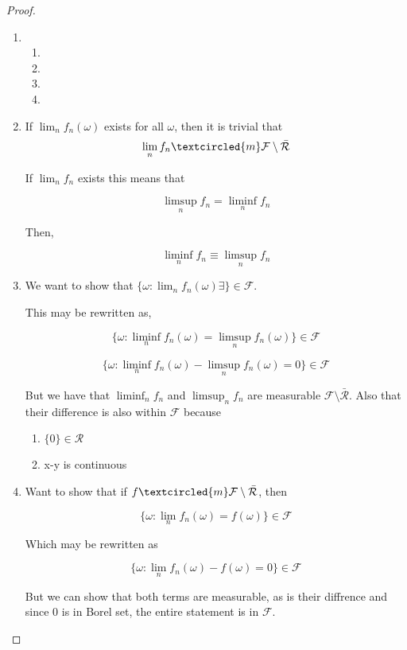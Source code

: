 \documentclass[11pt,fleqn]{book} %
\begin{document}
\begin{proof}

\begin{enumerate}
	\item \begin{enumerate}
		\item 
		\item 
		\item
		\item
	\end{enumerate}
	
	\item If $\lim_n f_n (\omega)$ exists for all $\omega$, then it is trivial that
			$$\lim_n f_n \textcircled{m} \mathcal{F}\setminus \bar{\mathcal{R}} $$

		If $\lim_n f_n$ exists this means that 	

				$$\limsup_n f_n = \liminf_n f_n $$

		Then, 

				$$ \liminf_n f_n \equiv	\limsup_n f_n $$

	\item We want to show that $\{\omega: \lim_n f_n(\omega) \exists \} \in \mathcal{F}$. 

			This may be rewritten as, 

				$$\{\omega: \liminf_n f_n(\omega) = \limsup_n f_n(\omega) \} \in \mathcal{F}$$

				$$\{\omega: \liminf_n f_n(\omega) - \limsup_n f_n(\omega) = 0 \} \in \mathcal{F}$$

		But we have that $\liminf_n f_n$ and $\limsup_n f_n$ are measurable $\mathcal{F}\setminus \bar{\mathcal{R}}$. Also that their difference is also within $\mathcal{F}$ because 

				\begin{enumerate}
					\item $\{0\} \in \mathcal{R}$
					\item x-y is continuous
				\end{enumerate}

	\item Want to show that if $f \textcircled{m} \mathcal{F}\setminus \bar{\mathcal{R}}$, then

			$$  \{\omega: \lim_n f_n(\omega) = f(\omega) \} \in \mathcal{F}$$

	Which may be rewritten as 

			$$ \{\omega: \lim_n f_n(\omega) - f(\omega) = 0 \} \in \mathcal{F}$$

	But we can show that both terms are measurable, as is their diffrence and since 0 is in Borel set, the entire statement is in $\mathcal{F}$. 
\end{enumerate}
\end{proof}
\end{document}
